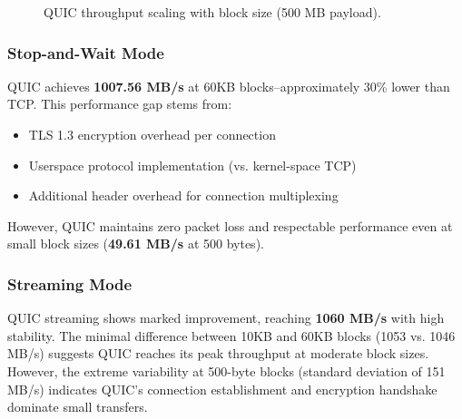 \documentclass[12pt,a4paper]{article}
\begin{document}
\begin{figure}
    \centering
    \caption{QUIC throughput scaling with block size (500 MB payload).}
    \label{fig:quic_scaling}
\end{figure}

\subsubsection{Stop-and-Wait Mode}
QUIC achieves \textbf{1007.56 MB/s} at 60KB blocks--approximately 30\% lower than TCP. This performance gap stems from:
\begin{itemize}
    \item TLS 1.3 encryption overhead per connection
    \item Userspace protocol implementation (vs. kernel-space TCP)
    \item Additional header overhead for connection multiplexing
\end{itemize}
However, QUIC maintains zero packet loss and respectable performance even at small block sizes (\textbf{49.61 MB/s} at 500 bytes).

\subsubsection{Streaming Mode}
QUIC streaming shows marked improvement, reaching \textbf{1060 MB/s} with high stability. The minimal difference between 10KB and 60KB blocks (1053 vs. 1046 MB/s) suggests QUIC reaches its peak throughput at moderate block sizes. However, the extreme variability at 500-byte blocks (standard deviation of 151 MB/s) indicates QUIC's connection establishment and encryption handshake dominate small transfers.
\end{document}

